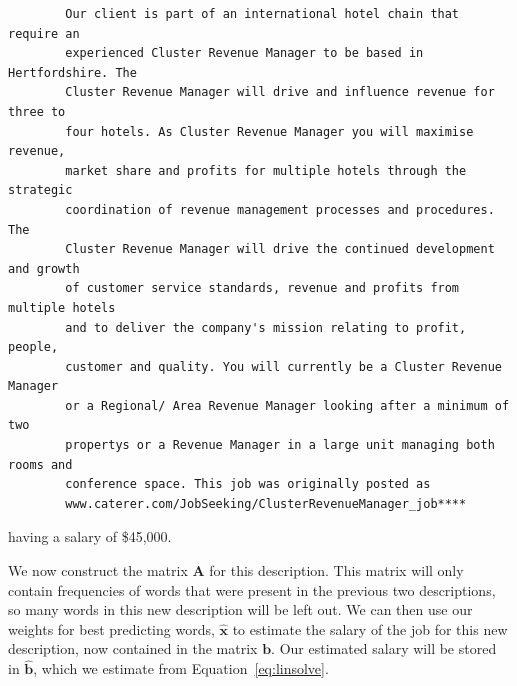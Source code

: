 \documentclass[12pt]{article}
\begin{document}
    \begin{lstlisting}
        Our client is part of an international hotel chain that require an
        experienced Cluster Revenue Manager to be based in Hertfordshire. The
        Cluster Revenue Manager will drive and influence revenue for three to
        four hotels. As Cluster Revenue Manager you will maximise revenue,
        market share and profits for multiple hotels through the strategic
        coordination of revenue management processes and procedures. The
        Cluster Revenue Manager will drive the continued development and growth
        of customer service standards, revenue and profits from multiple hotels
        and to deliver the company's mission relating to profit, people,
        customer and quality. You will currently be a Cluster Revenue Manager
        or a Regional/ Area Revenue Manager looking after a minimum of two
        propertys or a Revenue Manager in a large unit managing both rooms and
        conference space. This job was originally posted as
        www.caterer.com/JobSeeking/ClusterRevenueManager_job****
    \end{lstlisting} having a salary of \$45,000.
    
    \begin{center} 
        
        
    \end{center}

    We now construct the matrix $\bm{A}$ for this description. This matrix will
    only contain frequencies of words that were present in the previous two
    descriptions, so many words in this new description will be left out. We
    can then use our weights for best predicting words, $\bm{\hat{x}}$ to
    estimate the salary of the job for this new description, now contained in
    the matrix $\bm{b}$. Our estimated salary will be stored in $\bm{\hat{b}}$,
    which we estimate from Equation~\ref{eq:linsolve}. \\
\end{document}
